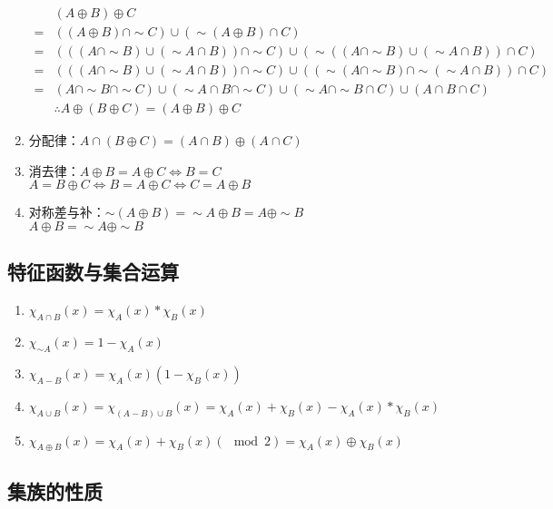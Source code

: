 \documentclass{book}
\newcommand{\Eqv}{\Leftrightarrow}
\begin{document}
\begin{enumerate}
        \begin{align*}
           &(A\oplus B)\oplus C\\
           =&((A\oplus B)\cap\sim C)\cup (\sim (A\oplus B)\cap C)\\
           =&(((A\cap\sim B)\cup (\sim A\cap B))\cap\sim C)\cup (\sim ((A\cap\sim B)\cup (\sim A\cap B))\cap C)\\
           =&(((A\cap\sim B)\cup (\sim A\cap B))\cap\sim C)\cup ((\sim (A\cap\sim B)\cap\sim (\sim A\cap B))\cap C)\\
           =&(A\cap\sim B\cap\sim C)\cup (\sim A\cap B\cap\sim C)\cup (\sim A\cap\sim B\cap C)\cup (A\cap B\cap C)\\
           &\therefore A\oplus\left( B\oplus C \right)=\left( A\oplus B \right)\oplus C
        \end{align*}

    \item 分配律：$A\cap (B\oplus C)=(A\cap B)\oplus (A\cap C)$
    \item 消去律：$A\oplus B=A\oplus C\Eqv B=C$\\
        $A=B\oplus C\Eqv B=A\oplus C\Eqv C=A\oplus B$
    \item 对称差与补：$\sim\left( A\oplus B \right)=\sim A\oplus B=A\oplus\sim B$\\
        $A\oplus B=\sim A\oplus\sim B$
\end{enumerate}
\subsection{特征函数与集合运算}
\begin{enumerate}
    \item $\chi_{A\cap B}(x)=\chi_A(x)*\chi_B(x)$
    \item $\chi_{\sim A}(x)=1-\chi_A(x)$
    \item $\chi_{A-B}(x)=\chi_A(x)\left( 1-\chi_B(x) \right)$
    \item $\chi_{A\cup B}(x)=\chi_{(A-B)\cup B}(x)=\chi_A(x)+\chi_B(x)-\chi_A(x)*\chi_B(x)$
    \item $\chi_{A\oplus B}(x)=\chi_A(x)+\chi_B(x)(\mod 2)=\chi_A(x)\oplus\chi_B(x)$
\end{enumerate}
\subsection{集族的性质}
\ifx\allfiles\undefined
\end{document}
